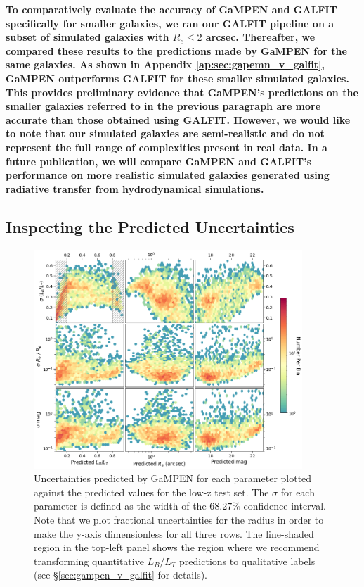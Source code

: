 \documentclass[linenumbers,twocolumn,twocolappendix]{aastex631}
\newcommand\gampen{GaMPEN}
\begin{document}
\begin{CJK*}{UTF8}{gbsn}
 \textbf{To comparatively evaluate the accuracy of \gampen{} and GALFIT specifically for smaller galaxies, we ran our GALFIT pipeline on a subset of simulated galaxies with $R_e \leq 2$ arcsec. Thereafter, we compared these results to the predictions made by \gampen{} for the same galaxies. As shown in Appendix \ref{ap:sec:gapemn_v_galfit}, \gampen{} outperforms GALFIT for these smaller simulated galaxies. This provides preliminary evidence that \gampen{}'s predictions on the smaller galaxies referred to in the previous paragraph are more accurate than those obtained using GALFIT. However, we would like to note that our simulated galaxies are semi-realistic and do not represent the full range of complexities present in real data. In a future publication, we will compare \gampen{} and GALFIT's performance on more realistic simulated galaxies generated using radiative transfer from hydrodynamical simulations.}

\subsection{Inspecting the Predicted Uncertainties} \label{sec:uncertainties}

\begin{figure}[htb]
    \centering
    \includegraphics[width = 0.9\textwidth]{2d_uncer_low_z.png}
    \caption{Uncertainties predicted by \gampen{} for each parameter plotted against the predicted values for the low-z test set. The $\sigma$ for each parameter is defined as the width of the $68.27\%$ confidence interval. Note that we plot fractional uncertainties for the radius in order to make the y-axis dimensionless for all three rows. The line-shaded region in the top-left panel shows the region where we recommend transforming quantitative $L_B/L_T$ predictions to qualitative labels (see \S \ref{sec:gampen_v_galfit} for details).}
    \label{fig:2d_uncer_low_z}
\end{figure}


\end{CJK*}
\end{document}
